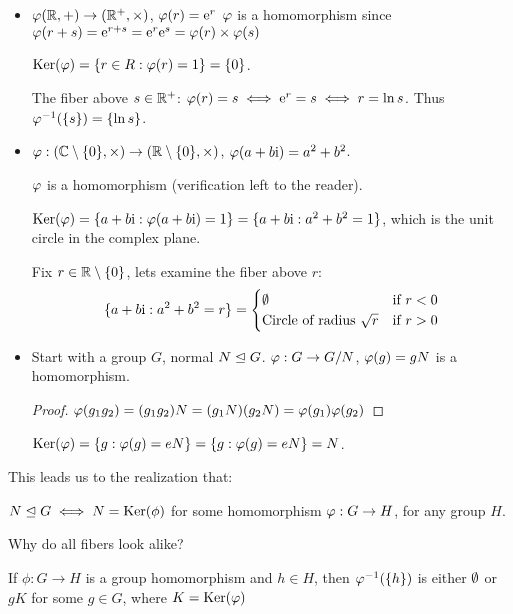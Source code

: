 \documentclass[notes.tex]{subfiles}
\begin{document}
\begin{eg}\leavevmode
\begin{itemize}
	\item $\varphi(\mathbb{R}, +)\to(\mathbb{R}^+, \times)$, $\varphi(r) = \mathrm{e}^r$
	$\varphi$ is a homomorphism since $\varphi(r+s) = \mathrm{e}^{r+s} = \mathrm{e}^r\mathrm{e}^s = \varphi(r)\times \varphi(s)$

	$\operatorname{\mathrm{Ker}}(\varphi) = \{r\in R : \varphi(r) = 1\} = \{0\}$.

	The fiber above $s\in \mathbb{R}^+$:
		$\varphi(r) = s \iff \mathrm{e}^r=s \iff r = \ln s$. Thus ${\varphi}^{-1}(\{s\}) = \{\ln s\}$.

	\item $\varphi:(\mathbb{C}\setminus\{0\}, \times)\to(\mathbb{R}\setminus\{0\}, \times)$,
		$\varphi(a+b\mathrm{i}) = a^2 + b^2$.

		$\varphi$ is a homomorphism (verification left to the reader).

		$\operatorname{\mathrm{Ker}}(\varphi) = \{a+b\mathrm{i} : \varphi(a+b\mathrm{i}) = 1\} = \{a+b\mathrm{i} : a^2 + b^2 = 1\}$,
		which is the unit circle in the complex plane.

		Fix $r\in\mathbb{R}\setminus\{0\}$, lets examine the fiber above $r$:
		\[
		\{a+b\mathrm{i} : a^2 + b^2 = r\} =
		\begin{cases}
			\emptyset &\text{if } r < 0\\
			\text{Circle of radius }\sqrt{r}&\text{if } r > 0
		\end{cases}
		\]
	\item Start with a group $G$, normal $N\trianglelefteq G$.
		$\varphi:G\to G/N$, $\varphi(g) = gN$ is a homomorphism.

		\begin{proof}
			$\varphi(g_1g_2) = (g_1g_2)N = (g_1N)(g_2N) = \varphi(g_1)\varphi(g_2)$
		\end{proof}

		$\operatorname{\mathrm{Ker}}(\varphi) = \{g:\varphi(g) = eN\} = \{g:\varphi(g) = eN\} = N$.
\end{itemize}
\end{eg}

This leads us to the realization that:
\begin{proposition}
	$N\trianglelefteq G \iff N = \operatorname{\mathrm{Ker}}(\phi)$
	for some homomorphism $\varphi:G\to H$, for any group $H$.
\end{proposition}

Why do all fibers look alike?

\begin{proposition}
	If $\phi:G\to H$ is a group homomorphism and $h\in H$,
	then ${\varphi}^{-1}(\{h\})$ is either $\emptyset$ or $gK$ for some $g\in G$, where $K = \operatorname{\mathrm{Ker}}(\varphi)$
\end{proposition}
\end{document}
